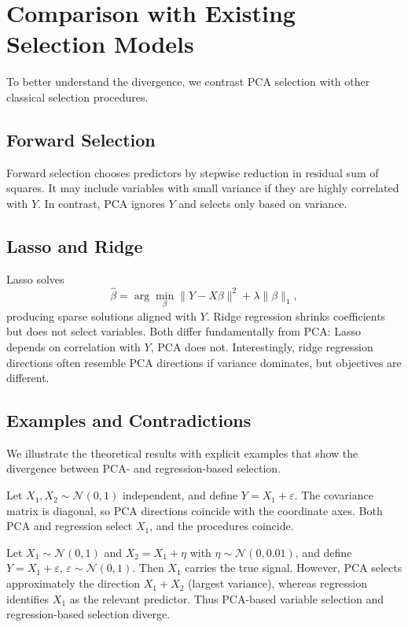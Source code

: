 \section{Comparison with Existing Selection Models}


To better understand the divergence, we contrast PCA selection with other 
classical selection procedures. 

\subsection{Forward Selection}
Forward selection chooses predictors by stepwise reduction in residual sum of squares. 
It may include variables with small variance if they are highly correlated with $Y$. 
In contrast, PCA ignores $Y$ and selects only based on variance.

\subsection{Lasso and Ridge}
Lasso solves
\[
\hat\beta = \arg\min_\beta \|Y - X\beta\|^2 + \lambda \|\beta\|_1,
\]
producing sparse solutions aligned with $Y$. Ridge regression shrinks coefficients but does not select variables. 
Both differ fundamentally from PCA: Lasso depends on correlation with $Y$, PCA does not. 
Interestingly, ridge regression directions often resemble PCA directions if variance dominates, but objectives are different.

\subsection{Examples and Contradictions}

We illustrate the theoretical results with explicit examples that show the divergence 
between PCA- and regression-based selection.

\begin{example}
Let $X_1, X_2 \sim \mathcal{N}(0,1)$ independent, and define $Y = X_1 + \varepsilon$. 
The covariance matrix is diagonal, so PCA directions coincide with the coordinate axes. 
Both PCA and regression select $X_1$, and the procedures coincide. 
\end{example}

\begin{example}
Let $X_1 \sim \mathcal{N}(0,1)$ and $X_2 = X_1 + \eta$ with $\eta \sim \mathcal{N}(0,0.01)$, 
and define $Y = X_1 + \varepsilon$, $\varepsilon \sim \mathcal{N}(0,1)$. 
Then $X_1$ carries the true signal. 
However, PCA selects approximately the direction $X_1+X_2$ (largest variance), 
whereas regression identifies $X_1$ as the relevant predictor. 
Thus PCA-based variable selection and regression-based selection diverge. 
\end{example}

